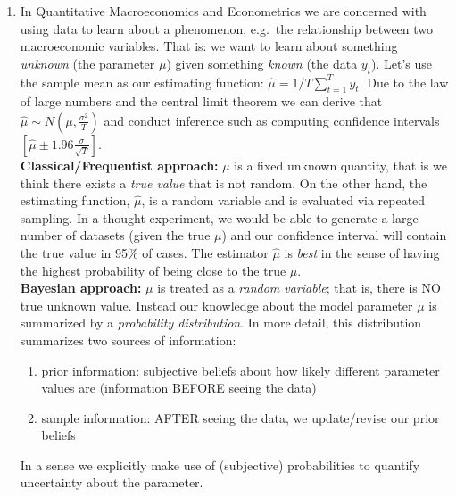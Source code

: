 \begin{enumerate}
\item In Quantitative Macroeconomics and Econometrics we are concerned with using data to learn about a phenomenon,
  e.g.\ the relationship between two macroeconomic variables.
That is: we want to learn about something \emph{unknown} (the parameter \(\mu \)) given something \emph{known} (the data \(y_t\)).
Let's use the sample mean as our estimating function:
\(\hat{\mu}=1/T \sum_{t=1}^T y_t\).
Due to the law of large numbers and the central limit theorem we can derive that
\(\hat{\mu}\sim N(\mu,\frac{\sigma^2}{T})\)
and conduct inference such as computing confidence intervals \([\hat{\mu}\pm 1.96 \frac{\sigma}{\sqrt{T}}]\).
\\
\textbf{Classical/Frequentist approach:} \(\mu \) is a fixed unknown quantity, that is we think there exists a \emph{true value} that is not random.
On the other hand, the estimating function, \(\hat{\mu}\), is a random variable
and is evaluated via repeated sampling.
In a thought experiment, we would be able to generate a large number of datasets (given the true \(\mu \))
and our confidence interval will contain the true value in 95\% of cases.
The estimator \(\hat{\mu}\) is \emph{best} in the sense of having the highest probability of being close to the true \(\mu \).
\\
\textbf{Bayesian approach:} \(\mu \) is treated as a \emph{random variable};
that is, there is NO true unknown value.
Instead our knowledge about the model parameter \(\mu \) is summarized by a \emph{probability distribution}.
In more detail, this distribution summarizes two sources of information:
\begin{enumerate}
	\item prior information: subjective beliefs about how likely different parameter values are (information BEFORE seeing the data)
	\item sample information: AFTER seeing the data, we update/revise our prior beliefs
\end{enumerate}
In a sense we explicitly make use of (subjective) probabilities to quantify uncertainty about the parameter.


\end{enumerate}
